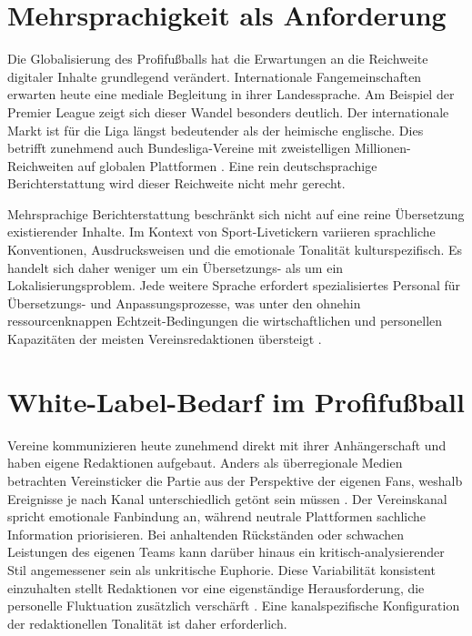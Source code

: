 \section{Mehrsprachigkeit als Anforderung}\label{mehrsprachigkeit-als-herausforderung}

Die Globalisierung des Profifußballs hat die Erwartungen an die Reichweite digitaler Inhalte grundlegend verändert. Internationale Fangemeinschaften erwarten heute eine mediale Begleitung in ihrer Landessprache. Am Beispiel der Premier League zeigt sich dieser Wandel besonders deutlich. Der internationale Markt ist für die Liga längst bedeutender als der heimische englische. Dies betrifft zunehmend auch Bundesliga-Vereine mit zweistelligen Millionen-Reichweiten auf globalen Plattformen \cite{beils2023}. Eine rein deutschsprachige Berichterstattung wird dieser Reichweite nicht mehr gerecht.

Mehrsprachige Berichterstattung beschränkt sich nicht auf eine reine Übersetzung existierender Inhalte. Im Kontext von Sport-Livetickern variieren sprachliche Konventionen, Ausdrucksweisen und die emotionale Tonalität kulturspezifisch. Es handelt sich daher weniger um ein Übersetzungs- als um ein Lokalisierungsproblem. Jede weitere Sprache erfordert spezialisiertes Personal für Übersetzungs- und Anpassungsprozesse, was unter den ohnehin ressourcenknappen Echtzeit-Bedingungen die wirtschaftlichen und personellen Kapazitäten der meisten Vereinsredaktionen übersteigt \cite{blum2023}.



\section{White-Label-Bedarf im Profifußball}\label{white-label-bedarf-im-profisport}

Vereine kommunizieren heute zunehmend direkt mit ihrer Anhängerschaft und haben eigene Redaktionen aufgebaut. Anders als überregionale Medien betrachten Vereinsticker die Partie aus der Perspektive der eigenen Fans, weshalb Ereignisse je nach Kanal unterschiedlich getönt sein müssen \cite{beils2023}. Der Vereinskanal spricht emotionale Fanbindung an, während neutrale Plattformen sachliche Information priorisieren. Bei anhaltenden Rückständen oder schwachen Leistungen des eigenen Teams kann darüber hinaus ein kritisch-analysierender Stil angemessener sein als unkritische Euphorie.
Diese Variabilität konsistent einzuhalten stellt Redaktionen vor eine eigenständige Herausforderung, die personelle Fluktuation zusätzlich verschärft \cite{blum2023}. Eine kanalspezifische Konfiguration der redaktionellen Tonalität ist daher erforderlich.

